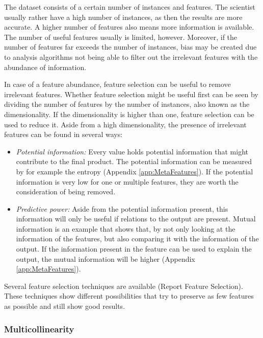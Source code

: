 \documentclass[10pt,a4paper]{article}
\begin{document}
	The dataset consists of a certain number of instances and features. The scientist usually rather have a high number of instances, as then the results are more accurate. A higher number of features also means more information is available. The number of useful features usually is limited, however. Moreover, if the number of features far exceeds the number of instances, bias may be created due to analysis algorithms not being able to filter out the irrelevant features with the abundance of information.
	
	In case of a feature abundance, feature selection can be useful to remove irrelevant features. Whether feature selection might be useful first can be seen by dividing the number of features by the number of instances, also known as the dimensionality. If the dimensionality is higher than one, feature selection can be used to reduce it. Aside from a high dimensionality, the presence of irrelevant features can be found in several ways:
	
	\begin{itemize}
		\item \textit{Potential information:} Every value holds potential information that might contribute to the final product. The potential information can be measured by for example the entropy\cite{agresti2003categorical} (Appendix \ref{app:MetaFeatures}). If the potential information is very low for one or multiple features, they are worth the consideration of being removed.
		\item \textit{Predictive power:} Aside from the potential information present, this information will only be useful if relations to the output are present. Mutual information is an example that shows that, by not only looking at the information of the features, but also comparing it with the information of the output. If the information present in the feature can be used to explain the output, the mutual information will be higher\cite{peng2005feature} (Appendix \ref{app:MetaFeatures}).
		\end{itemize}
	
	Several feature selection techniques are available (Report Feature Selection). These techniques show different possibilities that try to preserve as few features as possible and still show good results.
	
	\subsubsection{Multicollinearity}
	
\end{document}
